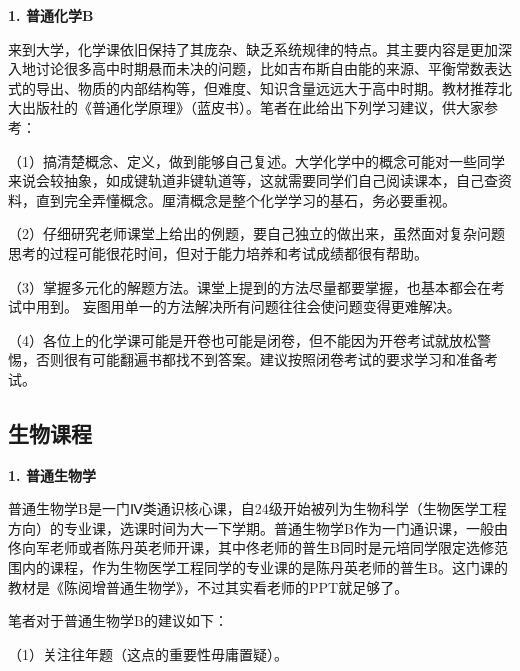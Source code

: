 \documentclass[11pt,oneside]{book}
\begin{document}
\textbf{1. 普通化学B}

来到大学，化学课依旧保持了其庞杂、缺乏系统规律的特点。其主要内容是更加深入地讨论很多高中时期悬而未决的问题，比如吉布斯自由能的来源、平衡常数表达式的导出、物质的内部结构等，但难度、知识含量远远大于高中时期。教材推荐北大出版社的《普通化学原理》（蓝皮书）。笔者在此给出下列学习建议，供大家参考：

\vspace{10pt}

（1）搞清楚概念、定义，做到能够自己复述。大学化学中的概念可能对一些同学来说会较抽象，如成键轨道非键轨道等，这就需要同学们自己阅读课本，自己查资料，直到完全弄懂概念。厘清概念是整个化学学习的基石，务必要重视。

\vspace{10pt}

（2）仔细研究老师课堂上给出的例题，要自己独立的做出来，虽然面对复杂问题思考的过程可能很花时间，但对于能力培养和考试成绩都很有帮助。

\vspace{10pt}

（3）掌握多元化的解题方法。课堂上提到的方法尽量都要掌握，也基本都会在考试中用到。 妄图用单一的方法解决所有问题往往会使问题变得更难解决。

\vspace{10pt}

（4）各位上的化学课可能是开卷也可能是闭卷，但不能因为开卷考试就放松警惕，否则很有可能翻遍书都找不到答案。建议按照闭卷考试的要求学习和准备考试。

\subsection{生物课程}

\textbf{1. 普通生物学}

普通生物学B是一门Ⅳ类通识核心课，自24级开始被列为生物科学（生物医学工程方向）的专业课，选课时间为大一下学期。普通生物学B作为一门通识课，一般由佟向军老师或者陈丹英老师开课，其中佟老师的普生B同时是元培同学限定选修范围内的课程，作为生物医学工程同学的专业课的是陈丹英老师的普生B。这门课的教材是《陈阅增普通生物学》，不过其实看老师的PPT就足够了。

\vspace{10pt}

笔者对于普通生物学B的建议如下：

\vspace{10pt}

（1）关注往年题（这点的重要性毋庸置疑）。

\vspace{10pt}
\end{document}
